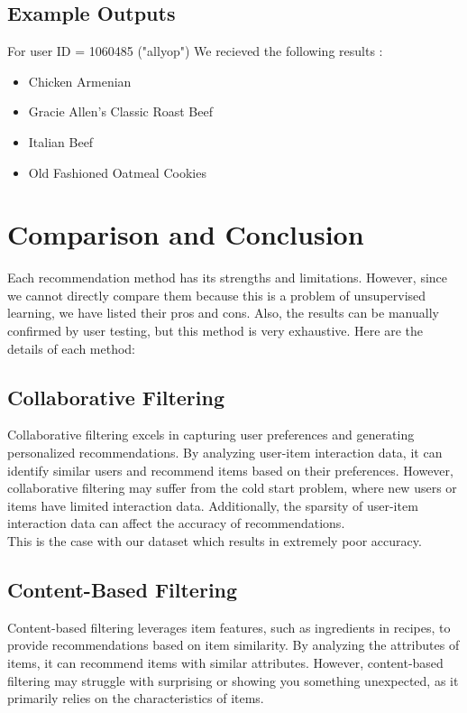 \documentclass[conference]{IEEEtran}
\begin{document}
\subsection{Example Outputs}
For user ID = 1060485 ("allyop")
We recieved the following results :
\begin{itemize}
    \item Chicken Armenian
    \item Gracie Allen's Classic Roast Beef
    \item Italian Beef
    \item Old Fashioned Oatmeal Cookies
\end{itemize}

\section{Comparison and Conclusion}

Each recommendation method has its strengths and limitations. However, since we cannot directly compare them because this is a problem of unsupervised learning, we have listed their pros and cons. Also, the results can be manually confirmed by user testing, but this method is very exhaustive. Here are the details of each method:

\subsection{Collaborative Filtering}

Collaborative filtering excels in capturing user preferences and generating personalized recommendations. By analyzing user-item interaction data, it can identify similar users and recommend items based on their preferences. However, collaborative filtering may suffer from the cold start problem, where new users or items have limited interaction data. Additionally, the sparsity of user-item interaction data can affect the accuracy of recommendations.\\
This is the case with our dataset which results in extremely poor accuracy.

\subsection{Content-Based Filtering}

Content-based filtering leverages item features, such as ingredients in recipes, to provide recommendations based on item similarity. By analyzing the attributes of items, it can recommend items with similar attributes. However, content-based filtering may struggle with surprising or showing you something unexpected, as it primarily relies on the characteristics of items.
\end{document}
